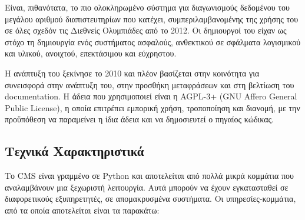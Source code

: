 \documentclass[diploma]{softlab-thesis}
\begin{document}
\bigskip

Είναι, πιθανότατα, το πιο ολοκληρωμένο σύστημα για διαγωνισμούς δεδομένου του
μεγάλου αριθμού διαπιστευτηρίων που κατέχει, συμπεριλαμβανομένης της χρήσης του
σε όλες σχεδόν τις Διεθνείς Ολυμπιάδες από το 2012. Οι δημιουργοί του είχαν ως
στόχο τη δημιουργία ενός συστήματος ασφαλούς, ανθεκτικού σε σφάλματα λογισμικού
και υλικού, ανοιχτού, επεκτάσιμου και εύχρηστου.

\bigskip

Η ανάπτυξη του ξεκίνησε το 2010 και πλέον βασίζεται στην κοινότητα για
συνεισφορά στην ανάπτυξη του, στην προσθήκη μεταφράσεων και στη βελτίωση του
documentation. H άδεια που χρησιμοποιεί είναι η AGPL-3+ (GNU Affero General
Public License), η οποία επιτρέπει εμπορική χρήση, τροποποίηση και διανομή, με
την προϋπόθεση να παραμείνει η ίδια άδεια και να δημοσιευτεί ο πηγαίος κώδικας.

\subsection{Τεχνικά Χαρακτηριστικά}

Το CMS είναι γραμμένο σε Python και αποτελείται από πολλά μικρά κομμάτια που
αναλαμβάνουν μια ξεχωριστή λειτουργία. Αυτά μπορούν να έχουν εγκατασταθεί σε
διαφορετικούς εξυπηρετητές, σε απομακρυσμένα συστήματα. Οι υπηρεσίες-κομμάτια, από
τα οποία αποτελείται είναι τα παρακάτω:
\end{document}
